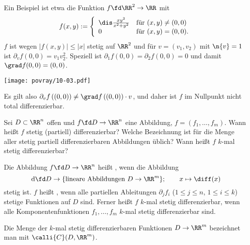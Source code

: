 \begin{antwort}
  Ein Beispiel ist etwa die Funktion 
  $f \fd \RR^2 \to \RR$ mit  
  \[
  f(x,y) := \left\{ \begin{array}{ll} 
      \dis \frac{xy^2}{x^2+y^2} & \text{für $(x,y)\not=(0,0)$} \\
      0 & \text{für $(x,y)=(0,0)$}. \end{array}\right.
  \]
  $f$ ist wegen $| f(x,y) | \le |x| $ stetig auf $\RR^2$ und für $v=(v_1,v_2)$ 
  mit $\n{v}=1$ ist $\partial_v f(0,0) = v_1 v_2^2$. Speziell ist 
  $\partial_1 f(0,0) = \partial_2 f(0,0)=0$ und damit $\grad f(0,0)=(0,0)$. 

  \begin{center}
    \texttt{[image: povray/10-03.pdf]}
    \label{fig:10-03}
  \end{center}
  Es gilt also $\partial_v f\left((0,0)\right) \not= \grad f\left((0,0)\right) \cdot v$, und daher ist $f$ im Nullpunkt nicht 
  total differenzierbar.\AntEnd
\end{antwort}

\begin{frage}
  Sei $D\subset \RR^n$ offen und $f\fd D\to \RR^n$ eine Abbildung, 
  $f=(f_1, \ldots, f_m)$. Wann heißt $f$ stetig (partiell) differenzierbar? 
  Welche Bezeichnung ist für die Menge aller stetig partiell differenzierbaren 
  Abbildungen üblich? Wann heißt $f$ $k$-mal stetig differenzierbar?
\end{frage}

\begin{antwort}
  Die Abbildung $f \fd D\to \RR^n$ heißt , 
  wenn die Abbildung 
  \[
  \mathrm{d}\fd D \to \{ \text{lineare Abbildungen $D\to \RR^m$} \}; \qquad 
  x\mapsto \diff (x)
  \]
  stetig ist. $f$ heißt , wenn alle 
  partiellen Ableitungen $\partial_j f_i$ ($1\le j \le n$, $1\le i \le k$) 
  stetige Funktionen auf $D$ sind. Ferner heißt $f$ 
  $k$-mal stetig differenzierbar, wenn alle Komponentenfunktionen 
  $f_1, \ldots, f_m$ $k$-mal stetig differenzierbar sind.

  Die Menge der $k$-mal stetig differenzierbaren Funktionen 
  $D \to \RR^m$ bezeichnet man mit $\calli{C}( D, \RR^m )$.
  \AntEnd
\end{antwort}

